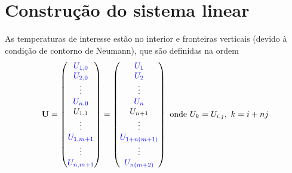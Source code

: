 \documentclass{article}
\begin{document}
    \section{Construção do sistema linear}
    As temperaturas de interesse estão no interior e fronteiras verticais (devido à condição de contorno de Neumann), que são definidas na ordem
    \[\mathbf{U} = \begin{pmatrix}
        \color{blue}{U_{1,0}}\\
        \color{blue}{U_{2,0}}\\
        \vdots\\
        \color{blue}{U_{n,0}}\\
        U_{1,1}\\
        \vdots\\
        \color{blue}{U_{1,m+1}}\\
        \vdots\\
        \color{blue}{U_{n,m+1}}
    \end{pmatrix} = \begin{pmatrix}
        \color{blue}{U_1}\\
        \color{blue}{U_2}\\
        \vdots\\
        \color{blue}{U_n}\\
        U_{n+1}\\
        \vdots\\
        \color{blue}{U_{1+n(m+1)}}\\
        \vdots\\
        \color{blue}{U_{n(m+2)}}
    \end{pmatrix} \text{ onde $U_k = U_{i,j},\ k = i + nj$}\]
\end{document}
